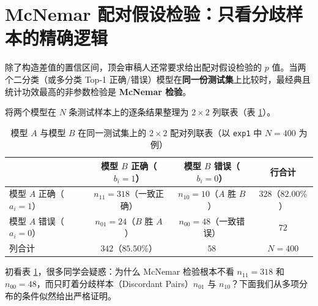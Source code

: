 \section{McNemar 配对假设检验：只看分歧样本的精确逻辑}

除了构造差值的置信区间，顶会审稿人还常要求给出配对假设检验的 $p$ 值。当两个二分类（或多分类 Top-1 正确/错误）模型在\textbf{同一份测试集}上比较时，最经典且统计功效最高的非参数检验是 \textbf{McNemar 检验}。

将两个模型在 $N$ 条测试样本上的逐条结果整理为 $2\times 2$ 列联表（表 \ref{tab:mcnemar-table}）。

\begin{table}[htbp]
  \centering
  \caption{模型 $A$ 与模型 $B$ 在同一测试集上的 $2\times 2$ 配对列联表（以 \texttt{exp1} 中 $N=400$ 为例）}
  \label{tab:mcnemar-table}
  \small
  \begin{tabular}{@{}lccc@{}}
    \toprule
    & 模型 $B$ 正确（$b_i=1$） & 模型 $B$ 错误（$b_i=0$） & 行合计 \\
    \midrule
    模型 $A$ 正确（$a_i=1$） & $n_{11} = 318$（一致正确） & $n_{10} = 10$（$A$ 胜 $B$） & $328$（$82.00\%$） \\
    模型 $A$ 错误（$a_i=0$） & $n_{01} = 24$（$B$ 胜 $A$） & $n_{00} = 48$（一致错误） & $72$ \\
    \midrule
    列合计 & $342$（$85.50\%$） & $58$ & $N = 400$ \\
    \bottomrule
  \end{tabular}
\end{table}

初看表 \ref{tab:mcnemar-table}，很多同学会疑惑：为什么 McNemar 检验根本不看 $n_{11}=318$ 和 $n_{00}=48$，而只盯着分歧样本（Discordant Pairs）$n_{01}$ 与 $n_{10}$？下面我们从多项分布的条件似然给出严格证明。

